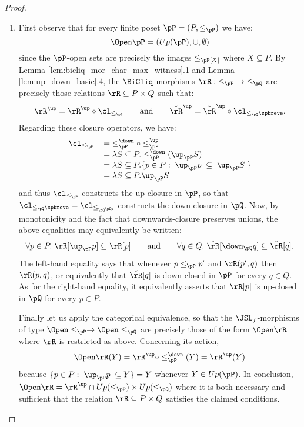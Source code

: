 \documentclass{article}
\begin{document}
\begin{proof}
\begin{enumerate}
\item
First observe that for every finite poset $\pP = (P,\leq_\pP)$ we have:
\[
\Open\pP = (Up(\pP),\cup,\emptyset)
\]
since the $\pP$-open sets are precisely the images $\leq_\pP[X]$ where $X \subseteq P$. By Lemma \ref{lem:bicliq_mor_char_max_witness}.1 and Lemma \ref{lem:up_down_basic}.4, the $\BiCliq$-morphisms $\rR : \; \leq_\pP \; \to \; \leq_\pQ$ are precisely those relations $\rR \subseteq P \times Q$ such that:
\[
 \rR^\up = \rR^\up \circ \cl_{\leq_\pP}
 \qquad\text{and}\qquad
 \breve{\rR}^\up = \breve{\rR}^\up \circ \cl_{\leq_\pQ\spbreve}.
\]
Regarding these closure operators, we have:
\[
\begin{tabular}{lll}
$\cl_{\leq_\pP}$
&
$= \; \leq_\pP^\down \circ \leq_\pP^\up$
\\&
$= \lambda S \subseteq P. \leq_\pP^\down(\up_\pP S)$
\\&
$= \lambda S \subseteq P. \{ p \in P : \; \up_\pP p \; \subseteq \; \up_\pP S \; \}$
\\&
$= \lambda S \subseteq P. \up_\pP S$
\end{tabular}
\]
and thus $\cl_{\leq_\pP}$ constructs the up-closure in $\pP$, so that $\cl_{\leq_\pQ\spbreve} = \cl_{\leq_{\pQ^{\pOp}}}$ constructs the down-closure in $\pQ$. Now, by monotonicity and the fact that downwards-closure preserves unions, the above equalities may equivalently be written:
\[
\forall p \in P. \; \rR[\up_\pP p] \subseteq \rR[p]
 \qquad\text{and}\qquad
\forall q \in Q. \; \breve{\rR}[\down_\pQ q] \subseteq \breve{\rR}[q].
\]
The left-hand equality says that whenever $p \leq_\pP p'$ and $\rR(p',q)$ then $\rR(p,q)$, or equivalently that $\breve{\rR}[q]$ is down-closed in $\pP$ for every $q \in Q$. As for the right-hand equality, it equivalently asserts that $\rR[p]$ is up-closed in $\pQ$ for every $p \in P$.

Finally let us apply the categorical equivalence, so that the $\JSL_f$-morphisms of type $\Open\leq_\pP \to \Open\leq_\pQ$ are precisely those of the form $\Open\rR$ where $\rR$ is restricted as above. Concerning its action,
\[
\Open\rR (Y) 
= \rR^\up \circ \leq_\pP^\down(Y)
= \rR^\up(Y)
\]
because $\{ p \in P : \; \up_\pP p \; \subseteq Y \} = Y$ whenever $Y \in Up(\pP)$. In conclusion, $\Open\rR = \rR^\up \cap Up(\leq_\pP) \times Up(\leq_\pQ)$ where it is both necessary and sufficient that the relation $\rR \subseteq P \times Q$ satisfies the claimed conditions.

\end{enumerate}
\end{proof}
\end{document}
